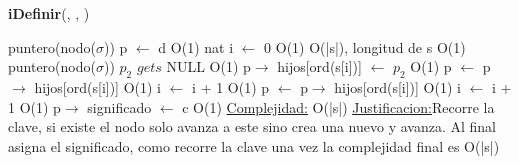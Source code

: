 \begin{Representacion}
\begin{Algoritmos}
\begin{algorithm}[H]{\textbf{iDefinir}(, , )}
	\begin{algorithmic}[1]
		\State puntero(nodo($\sigma$)) p $\gets$ d \Comment O(1)
		\State nat i $\gets$ 0 \Comment O(1)
		 \Comment O(|s|), longitud de s
			 \Comment O(1) 
				puntero(nodo($\sigma$)) $p_2$ $gets$ NULL \Comment O(1)
				p$\to$ hijos[ord(s[i])] $\gets$ $p_2$ \Comment O(1)	
				p $\gets$ p$\to$ hijos[ord(s[i])] \Comment O(1)
				i $\gets$ i + 1 \Comment O(1)
			\Else
				p $\gets$ p$\to$ hijos[ord(s[i])] \Comment O(1)
				i $\gets$ i + 1 \Comment O(1)
			\EndIf
		\EndWhile
		p$\to$ significado $\gets$ c \Comment O(1)		
		\medskip
		\Statex \underline{Complejidad:} O(|s|)
			\Statex \underline{Justificacion:}Recorre la clave, si existe el nodo solo avanza a este sino crea una nuevo y avanza. Al final asigna el significado, como recorre la clave una vez la complejidad final es O(|s|)
	\end{algorithmic}
\end{algorithm}

\end{Algoritmos}

\end{Representacion}